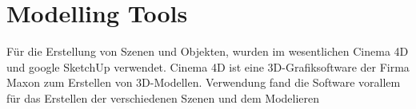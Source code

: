 \section{Modelling Tools}
Für die Erstellung von Szenen und Objekten, wurden im wesentlichen Cinema 4D und google SketchUp verwendet. Cinema 4D ist eine 3D-Grafiksoftware der Firma Maxon zum Erstellen von 3D-Modellen. Verwendung fand die Software vorallem für das Erstellen der verschiedenen Szenen und dem Modelieren